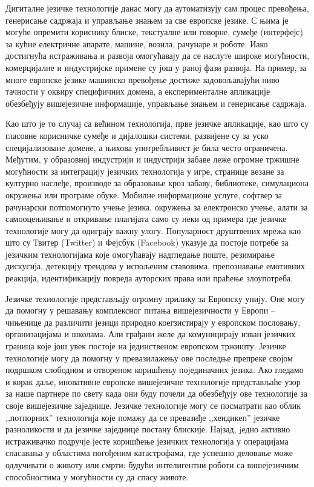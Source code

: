 \begin{multicols}{2}
Дигиталне језичке технологије данас могу да аутоматизују сам процес превођења, генерисање садржаја и управљање знањем за све европске језике. С њима је могуће опремити кориснику блиске, текстуалне или говорне, сумеђе (интерфејс) за кућне електричне апарате,  машине, возила, рачунаре и роботе. Иако достигнућа истраживања и развоја омогућавају да се наслуте широке могућности, комерцијалне и индустријске примене су још у раној фази развоја. На пример, за многе европске језике машинско превођење достиже задовољавајући ниво тачности у оквиру специфичних домена, а експерименталне апликације обезбеђују вишејезичне информације, управљање знањем и генерисање садржаја. 

Као што је то случај са већином технологија, прве језичке апликације, као што су гласовне корисничке сумеђе и дијалошки системи, развијене су за уско специјализоване домене, а њихова употребљивост је била често ограничена. Међутим, у образовној индустрији и индустрији забаве леже огромне тржишне могућности за интеграцију језичких технологија у игре, странице везане за културно наслеђе, производе за образовање кроз забаву, библиотеке, симулациона окружења или програме обуке. Мобилне информационе услуге, софтвер за рачунарски потпомогнуто учење језика, окружења за електронско учење, алати за самооцењивање и откривање плагијата само су неки од примера где језичке технологије могу да одиграју важну улогу. Популарност друштвених мрежа као што су Твитер (Twitter) и Фејсбук (Facebook) указује да постоје потребе за језичким технологијама које омогућавају надгледање поште, резимирање дискусија, детекцију трендова у испољеним ставовима, препознавање емотивних реакција, идентификацију повреда ауторских права или праћење злоупотреба.


Језичке технологије представљају огромну прилику за Европску унију. Оне могу да помогну у решавању комплексног питања вишејезичности у Европи -- чињенице да различити језици природно коегзистирају у европском пословању, организацијама и школама. Али грађани желе да комуницирају изван језичких граница које још увек постоје на јединственом европском тржишту. Језичке технологије могу да помогну у превазилажењу ове последње препреке својом подршком слободном и отвореном коришћењу појединачних језика. Ако гледамо и корак даље, иновативне европске вишејезичне технологије представљаће узор за наше партнере по свету када они буду почели да обезбеђују ове технологије за своје вишејезичне заједнице. Језичке технологије могу се посматрати као облик ,,потпорних'' технологија које помажу да се превазиђе ,,хендикеп'' језичке разноликости и да језичке заједнице постану блискије. Најзад, jедно активно истраживачко подручје  јесте коришћење језичких технологија у операцијама спасавања у областима погођеним  катастрофама, где успешно деловање може одлучивати о животу или смрти: будући интелигентни роботи са вишејезичним способностима у могућности су да спасу животе. 



\end{multicols}
